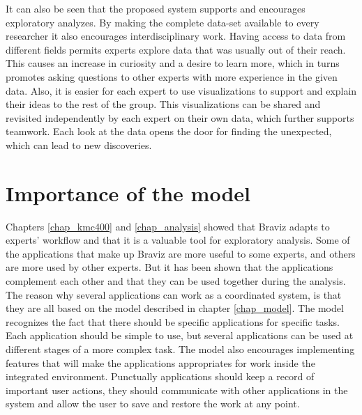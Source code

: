 It can also be seen that the proposed system supports and encourages exploratory analyzes. By making the complete data-set available to every researcher it also encourages interdisciplinary work. Having access to data from different fields permits experts explore data that was usually out of their reach. This causes an increase in curiosity and a desire to learn more, which in turns promotes asking questions to other experts with more experience in the given data. Also, it is easier for each expert to use visualizations to support and explain their ideas to the rest of the group. This visualizations can be shared and revisited independently by each expert on their own data, which further supports teamwork. Each look at the data opens the door for finding the unexpected, which can lead to new discoveries. 


\section{Importance of the model}


Chapters \ref{chap_kmc400} and \ref{chap_analysis} showed that Braviz adapts to experts' workflow and that it is a valuable tool for exploratory analysis. Some of the applications that make up Braviz are more useful to some experts, and others are more used by other experts. But it has been shown that the applications complement each other and that they can be used together during the analysis. The reason why several applications can work as a coordinated system, is that they are all based on the model described in chapter \ref{chap_model}. The model recognizes the fact that there should be specific applications for specific tasks. Each application should be simple to use, but several applications can be used at different stages of a more complex task. The model also encourages implementing features that will make the applications appropriates for work inside the integrated environment. Punctually applications should keep a record of important user actions, they should communicate with other applications in the system and allow the user to save and restore the work at any point. 

